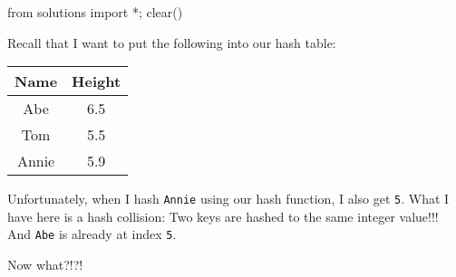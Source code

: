 \begin{python0}
from solutions import *; clear()
\end{python0}

Recall that I want to put the following into our hash table:
\begin{longtable}{|c|c|}
\hline
Name & Height \\
\hline
Abe &  6.5 \\
Tom &  5.5 \\
Annie &  5.9 \\
\hline
\end{longtable}
Unfortunately, when I hash \verb!Annie! using our
hash function, I also get \verb!5!.
What I have here is a hash collision:
Two keys are hashed to the same integer value!!!
And \verb!Abe! is already at index \verb!5!. 

Now what?!?!




\newpage
